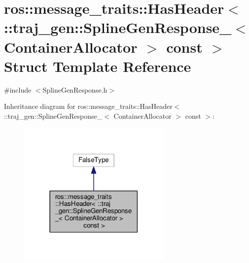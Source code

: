 \hypertarget{structros_1_1message__traits_1_1_has_header_3_01_1_1traj__gen_1_1_spline_gen_response___3_01_con1d0f3f08c39175b3253cd03ec47957a2}{}\section{ros\+:\+:message\+\_\+traits\+:\+:Has\+Header$<$ \+:\+:traj\+\_\+gen\+:\+:Spline\+Gen\+Response\+\_\+$<$ Container\+Allocator $>$ const $>$ Struct Template Reference}
\label{structros_1_1message__traits_1_1_has_header_3_01_1_1traj__gen_1_1_spline_gen_response___3_01_con1d0f3f08c39175b3253cd03ec47957a2}


{\ttfamily \#include $<$Spline\+Gen\+Response.\+h$>$}



Inheritance diagram for ros\+:\+:message\+\_\+traits\+:\+:Has\+Header$<$ \+:\+:traj\+\_\+gen\+:\+:Spline\+Gen\+Response\+\_\+$<$ Container\+Allocator $>$ const $>$\+:
\nopagebreak
\begin{figure}[H]
\begin{center}
\leavevmode
\includegraphics[width=213pt]{structros_1_1message__traits_1_1_has_header_3_01_1_1traj__gen_1_1_spline_gen_response___3_01_con7dfc813081338857bad60d02bb6992db}
\end{center}
\end{figure}


